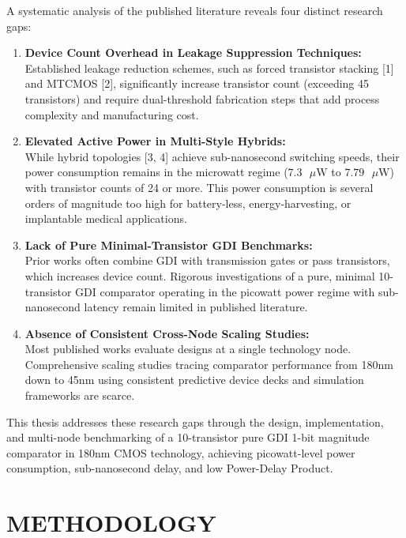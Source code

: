 \documentclass[12pt,a4paper,oneside]{report}
\begin{document}
A systematic analysis of the published literature reveals four distinct research gaps:
\begin{enumerate}
\item \textbf{Device Count Overhead in Leakage Suppression Techniques:}\\
Established leakage reduction schemes, such as forced transistor stacking [1] and MTCMOS [2], significantly increase transistor count (exceeding 45 transistors) and require dual-threshold fabrication steps that add process complexity and manufacturing cost.
\item \textbf{Elevated Active Power in Multi-Style Hybrids:}\\
While hybrid topologies [3, 4] achieve sub-nanosecond switching speeds, their power consumption remains in the microwatt regime ($7.3\text{ }\mu\text{W}$ to $7.79\text{ }\mu\text{W}$) with transistor counts of 24 or more. This power consumption is several orders of magnitude too high for battery-less, energy-harvesting, or implantable medical applications.
\item \textbf{Lack of Pure Minimal-Transistor GDI Benchmarks:}\\
Prior works often combine GDI with transmission gates or pass transistors, which increases device count. Rigorous investigations of a pure, minimal 10-transistor GDI comparator operating in the picowatt power regime with sub-nanosecond latency remain limited in published literature.
\item \textbf{Absence of Consistent Cross-Node Scaling Studies:}\\
Most published works evaluate designs at a single technology node. Comprehensive scaling studies tracing comparator performance from 180nm down to 45nm using consistent predictive device decks and simulation frameworks are scarce.
\end{enumerate}

This thesis addresses these research gaps through the design, implementation, and multi-node benchmarking of a 10-transistor pure GDI 1-bit magnitude comparator in 180nm CMOS technology, achieving picowatt-level power consumption, sub-nanosecond delay, and low Power-Delay Product.


\chapter{METHODOLOGY}
\end{document}
